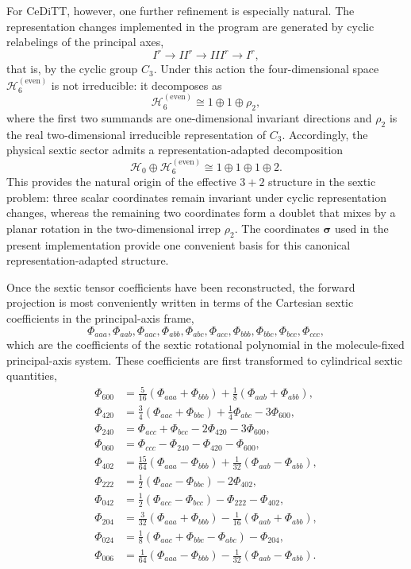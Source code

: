 For CeDiTT, however, one further refinement is especially natural.  The
representation changes implemented in the program are generated by cyclic
relabelings of the principal axes,
\[
I^r \rightarrow II^r \rightarrow III^r \rightarrow I^r,
\]
that is, by the cyclic group $C_3$.  Under this action the
four-dimensional space $\mathcal H_6^{(\mathrm{even})}$ is not irreducible:
it decomposes as
\[
\mathcal H_6^{(\mathrm{even})} \cong 1 \oplus 1 \oplus \rho_2,
\]
where the first two summands are one-dimensional invariant directions and
$\rho_2$ is the real two-dimensional irreducible representation of $C_3$.
Accordingly, the physical sextic sector admits a representation-adapted
decomposition
\begin{equation}
\mathcal H_0 \oplus \mathcal H_6^{(\mathrm{even})}
\cong
1 \oplus 1 \oplus 1 \oplus 2.
\label{eq:sextic_rep_adapted_3plus2}
\end{equation}
This provides the natural origin of the effective $3+2$ structure in the
sextic problem: three scalar coordinates remain invariant under cyclic
representation changes, whereas the remaining two coordinates form a doublet
that mixes by a planar rotation in the two-dimensional irrep $\rho_2$.  The
coordinates $\boldsymbol\sigma$ used in the present implementation provide one
convenient basis for this canonical representation-adapted structure.

Once the sextic tensor coefficients have been reconstructed, the forward
projection is most conveniently written in terms of the Cartesian sextic
coefficients in the principal-axis frame,
\[
\Phi_{aaa},\Phi_{aab},\Phi_{aac},\Phi_{abb},\Phi_{abc},\Phi_{acc},
\Phi_{bbb},\Phi_{bbc},\Phi_{bcc},\Phi_{ccc},
\]
which are the coefficients of the sextic rotational polynomial in the
molecule-fixed principal-axis system.  These coefficients are first transformed
to cylindrical sextic quantities,
\begin{align}
\Phi_{600} &= \frac{5}{16}(\Phi_{aaa}+\Phi_{bbb})
+\frac{1}{8}(\Phi_{aab}+\Phi_{abb}),\\
\Phi_{420} &= \frac{3}{4}(\Phi_{aac}+\Phi_{bbc})
+\frac{1}{4}\Phi_{abc}-3\Phi_{600},\\
\Phi_{240} &= \Phi_{acc}+\Phi_{bcc}-2\Phi_{420}-3\Phi_{600},\\
\Phi_{060} &= \Phi_{ccc}-\Phi_{240}-\Phi_{420}-\Phi_{600},\\
\Phi_{402} &= \frac{15}{64}(\Phi_{aaa}-\Phi_{bbb})
+\frac{1}{32}(\Phi_{aab}-\Phi_{abb}),\\
\Phi_{222} &= \frac{1}{2}(\Phi_{aac}-\Phi_{bbc})-2\Phi_{402},\\
\Phi_{042} &= \frac{1}{2}(\Phi_{acc}-\Phi_{bcc})
-\Phi_{222}-\Phi_{402},\\
\Phi_{204} &= \frac{3}{32}(\Phi_{aaa}+\Phi_{bbb})
-\frac{1}{16}(\Phi_{aab}+\Phi_{abb}),\\
\Phi_{024} &= \frac{1}{8}(\Phi_{aac}+\Phi_{bbc}-\Phi_{abc})
-\Phi_{204},\\
\Phi_{006} &= \frac{1}{64}(\Phi_{aaa}-\Phi_{bbb})
-\frac{1}{32}(\Phi_{aab}-\Phi_{abb}).
\end{align}

